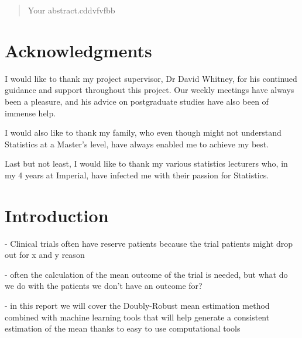 \documentclass[12pt,twoside]{article}
\date{October 2020}
\begin{document}



\clearpage{\pagestyle{empty}\cleardoublepage}
\setcounter{page}{1}
\pagestyle{fancy}
\setlength{\parindent}{5ex}
\begin{abstract}
Your abstract.cddvfvfbb


\end{abstract}

\cleardoublepage
\section*{Acknowledgments}
I would like to thank my project supervisor, Dr David Whitney, for his continued guidance and support throughout this project. Our weekly meetings have always been a pleasure, and his advice on postgraduate studies have also been of immense help. 

I would also like to thank my family, who even though might not understand Statistics at a Master's level, have always enabled me to achieve my best.

Last but not least, I would like to thank my various statistics lecturers who, in my 4 years at Imperial, have infected me with their passion for Statistics.

\clearpage{\pagestyle{empty}\cleardoublepage}

\tableofcontents 


\clearpage{\pagestyle{empty}\cleardoublepage}
\setcounter{page}{1}
\fancyhead[L]{\textsl{\leftmark}}

\section{Introduction} 

- Clinical trials often have reserve patients because the trial patients might drop out for x and y reason

- often the calculation of the mean outcome of the trial is needed, but what do we do with the patients we don't have an outcome for?

- in this report we will cover the Doubly-Robust mean estimation method combined with machine learning tools that will help generate a consistent estimation of the mean thanks to easy to use computational tools
\end{document}

